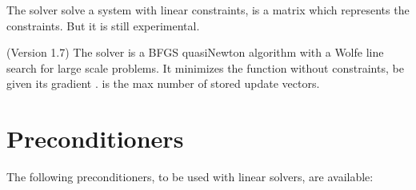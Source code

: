 \documentclass[a4paper,11pt,english]{sphinxmanual}
\begin{document}
The solver  solve a system with linear constraints,  is a matrix which represents the constraints. But it is still experimental.

(Version 1.7) The solver  is a BFGS quasi\sphinxhyphen{}Newton algorithm with a Wolfe line search for large scale problems. It minimizes the function  without constraints, be given its gradient .  is the max number of stored update vectors.


\section{Preconditioners}
\label{\detokenize{gmm/iter:preconditioners}}
The following preconditioners, to be used with linear solvers, are available:
\end{document}
